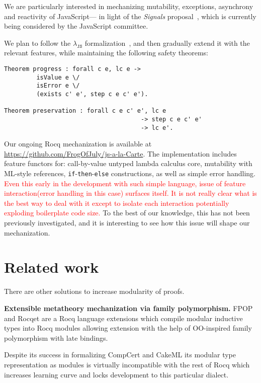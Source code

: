 \documentclass[sigplan,nonacm]{acmart}
\begin{document}
We are particularly interested in mechanizing
mutability, exceptions, asynchrony and reactivity of JavaScript---%
in light of the \emph{Signals} proposal~\cite{signals-proposal-t39},
which is currently being considered by the JavaScript committee.

We plan to follow the $\lambda_{\texttt{JS}}$ formalization~\cite{guha2010essence},
and then gradually extend it with the relevant features,
while maintaining the following safety theorems:

\begin{lstlisting}[numbers=none, language=Coq]
Theorem progress : forall c e, lc e -> 
         isValue e \/ 
         isError e \/ 
         (exists c' e', step c e c' e').

Theorem preservation : forall c e c' e', lc e
                                      -> step c e c' e'
                                      -> lc e'.
\end{lstlisting}

Our ongoing Rocq mechanization is available at
\url{https://github.com/FrogOfJuly/js-a-la-Carte}. 
The implementation includes feature functors for: call-by-value untyped lambda calculus core, mutability with ML-style references, \texttt{if}-\texttt{then}-\texttt{else} constructions, as well as simple error handling.
\textcolor{red}{Even this early in the development with such simple language, issue of feature interaction(error handling in this case) surfaces itself. It is not really clear what is the best way to deal with it except to isolate each interaction potentially exploding boilerplate code size.}
To the best of our knowledge, this has not been previously investigated, and it is interesting to see how this issue will shape our mechanization.

\section{Related work}

There are other solutions to increase modularity of proofs. 

\medskip

\textbf{Extensible metatheory mechanization via family polymorphism. } FPOP\cite{jin2023extensible} and Rocqet\cite{ebresafe2025certified} are a Rocq language extensions which compile modular inductive types into Rocq modules allowing extension with the help of 
OO-inspired family polymorphism with late bindings. 

Despite its success in formalizing CompCert and CakeML its modular type representation as modules is virtually incompatible with the rest of Rocq which increases learning curve and locks development to this particular dialect. 
\end{document}
